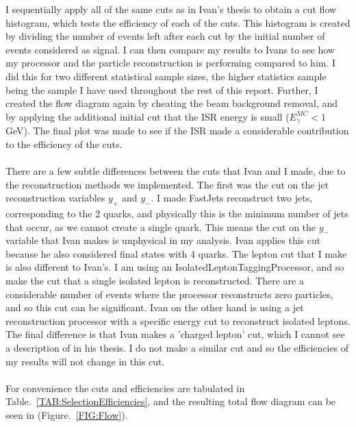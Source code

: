 I sequentially apply all of the same cuts as in Ivan’s thesis \cite{IvanMarchesini} to obtain a cut flow histogram, which tests the efficiency of each of the cuts. This histogram is created by dividing the number of events left after each cut by the initial number of events considered as signal. I can then compare my results to Ivans to see how my processor and the particle reconstruction is performing compared to him. I did this for two different statistical sample sizes, the higher statistics sample being the sample I have used throughout the rest of this report. Further, I created the flow diagram again by cheating the beam background removal, and by applying the additional initial cut that the ISR energy is small (${E}_{\gamma}^{MC} < 1$ GeV). The final plot was made to see if the ISR made a considerable contribution to the efficiency of the cuts.
\\\\
There are a few subtle differences between the cuts that Ivan and I made, due to the reconstruction methods we implemented. The first was the cut on the jet reconstruction variables ${y}_{+}$ and ${y}_{-}$. I made FastJets reconstruct two jets, corresponding to the 2 quarks, and physically this is the minimum number of jets that occur, as we cannot create a single quark. This means the cut on the ${y}_{-}$ variable that Ivan makes is unphysical in my analysis. Ivan applies this cut because he also considered final states with 4 quarks. The lepton cut that I make is also different to Ivan’s. I am using an IsolatedLeptonTaggingProcessor, and so make the cut that a single isolated lepton is reconstructed. There are a considerable number of events where the processor reconstructs zero particles, and so this cut can be significant. Ivan on the other hand is using a jet reconstruction processor with a specific energy cut to reconstruct isolated leptons. The final difference is that Ivan makes a 'charged lepton' cut, which I cannot see a description of in his thesis. I do not make a similar cut and so the efficiencies of my results will not change in this cut.
\\\\
For convenience the cuts and efficiencies are tabulated in Table.~\ref{TAB:SelectionEfficiencies}, and the resulting total flow diagram can be seen in (Figure.~\ref{FIG:Flow}).
\\\\
